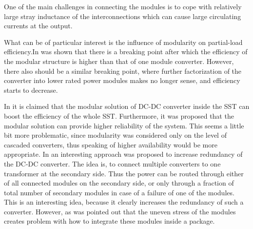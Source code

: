 \documentclass[]{scrartcl}
\begin{document}
One of the main challenges in connecting the modules is to cope with relatively large stray inductance of the interconnections which can cause large circulating currents at the output.


What can be of particular interest is the influence of modularity on partial-load efficiency.In \cite{Yang2014} was shown that there is a breaking point after which the efficiency of the modular structure is higher than that of one module converter. However, there also should be a similar breaking point, where further factorization of the converter into lower rated power modules makes no longer sense, and efficiency starts to decrease. 





%
In \cite{Quartarone} it is claimed that the modular solution of DC-DC converter inside the SST can boost the efficiency of the whole SST. Furthermore, it was proposed that the modular solution can provide higher reliability of the system. This seems a little bit more problematic, since modularity was considered only on the level of cascaded converters, thus speaking of higher availability would be more appropriate. 
%
In \cite{Costa2015} an interesting approach was proposed to increase redundancy of the DC-DC converter. 
The idea is, to connect multiple converters to one transformer at the secondary side. Thus the power can be routed through either of all connected modules on the secondary side, or only through a fraction of total number of secondary modules in case of a failure of  one of the modules. This is an interesting idea, because it clearly increases the redundancy of such a converter. However, as was pointed out that the uneven stress of the modules creates problem with how to integrate these modules inside a package. 
 
\end{document}

